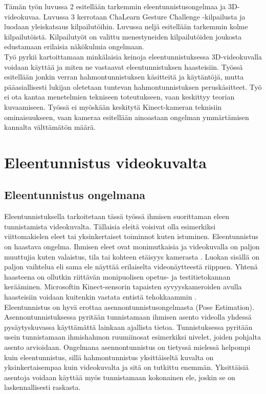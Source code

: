 Tämän työn luvussa 2 esitellään tarkemmin eleentunnistusongelmaa ja 3D-videokuvaa. Luvussa 3 kerrotaan
ChaLearn Gesture Challenge -kilpailusta ja luodaan yleiskatsaus kilpailutöihin. Luvussa neljä esitellään
tarkemmin kolme kilpailutöistä. Kilpailutyöt on valittu menestyneiden kilpailutöiden joukosta edustamaan erilaisia näkökulmia ongelmaan.\\

Työ pyrkii kartoittamaan minkälaisia keinoja eleentunnistuksessa 3D-videokuvalla voidaan käyttää ja miten ne vastaavat eleentunnistuksen haasteisiin.
Työssä esitellään jonkin verran hahmontunnistuksen käsitteitä ja käytäntöjä, mutta pääasiallisesti lukijan oletetaan tuntevan hahmontunnistuksen 
peruskäsitteet. Työ ei ota kantaa menetelmien tekniseen toteutukseen, vaan keskittyy teorian kuvaamiseen. Työssä ei myöskään keskitytä Kinect-kameran
teknisiin ominaisuukseen, vaan kameraa esitellään ainoastaan ongelman ymmärtämisen kannalta välttämätön määrä.


\section{Eleentunnistus videokuvalta}
\label{eleentunnistus videokuvalta}


\subsection{Eleentunnistus ongelmana}
Eleentunnistuksella tarkoitetaan tässä työssä ihmisen suorittaman eleen tunnistamista videokuvalta. Tällaisia eleitä voisivat olla esimerkiksi
viittomakielen eleet tai yksinkertaiset toiminnot kuten istuminen. Eleentunnistus on haastava ongelma. Ihmisen eleet ovat
monimutkaisia ja videokuvalla on paljon muuttujia kuten valaistus, tila tai kohteen etäisyys kamerasta \citep {1251144}. 
Luokan sisällä on paljon vaihtelua eli sama ele näyttää erilaiselta videonäytteestä riippuen.
Yhtenä haasteena on ollutkin riittävän monipuolisen opetus- ja testitietokannan kerääminen.
\citep{4587756} Microsoftin Kinect-sensorin tapaisten syvyyskameroiden avulla haasteisiin voidaan kuitenkin vastata entistä tehokkaammin \citep {6239178}.\\

Eleentunnistus on hyvä erottaa asennontunnistusongelmasta (Pose Estimation).
Asennontunnistuksessa pyritään tunnistamaan ihmisen asento videolla yhdessä pysäytyskuvassa
käyttämättä lainkaan ajallista tietoa. Tunnistuksessa pyritään usein tunnistamaan ihmishahmon ruumiinosat esimerkiksi nivelet,
joiden pohjalta asento arvioidaan. \citep{5995316} Ongelmana asennontunnistus on tietyssä mielessä helpompi
kuin eleentunnistus, sillä hahmontunnistus yksittäiseltä kuvalta on yksinkertaisempaa kuin videokuvalta ja sitä on tutkittu enemmän. 
Yksittäisiä asentoja voidaan käyttää myös tunnistamaan kokonainen ele, joskin se on laskennallisesti raskasta.  \\

